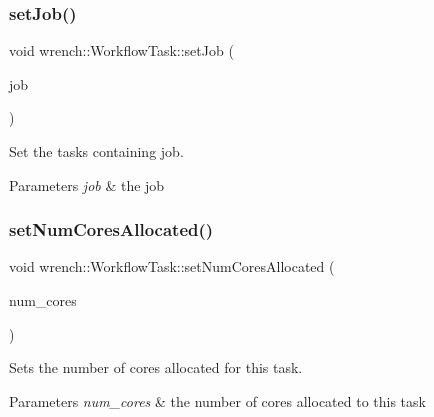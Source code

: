 \subsubsection{\texorpdfstring{set\+Job()}{setJob()}}
{\footnotesize\ttfamily void wrench\+::\+Workflow\+Task\+::set\+Job (\begin{DoxyParamCaption}\item[{\hyperlink{classwrench_1_1_workflow_job}{Workflow\+Job} $\ast$}]{job }\end{DoxyParamCaption})}



Set the task\textquotesingle{}s containing job. 


\begin{DoxyParams}{Parameters}
{\em job} & the job \\
\hline
\end{DoxyParams}
\mbox{\label{classwrench_1_1_workflow_task_ab912b19f9894a4231e2eff2ad9270bc8}} 
\subsubsection{\texorpdfstring{set\+Num\+Cores\+Allocated()}{setNumCoresAllocated()}}
{\footnotesize\ttfamily void wrench\+::\+Workflow\+Task\+::set\+Num\+Cores\+Allocated (\begin{DoxyParamCaption}\item[{unsigned long}]{num\+\_\+cores }\end{DoxyParamCaption})}



Sets the number of cores allocated for this task. 


\begin{DoxyParams}{Parameters}
{\em num\+\_\+cores} & the number of cores allocated to this task \\
\hline
\end{DoxyParams}
\mbox{\label{classwrench_1_1_workflow_task_ae5101ae5e4e386705a549e4e91432049}} 
